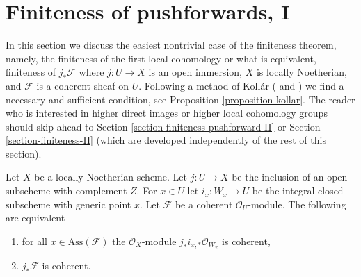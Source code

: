 \section{Finiteness of pushforwards, I}
\label{section-finiteness-pushforward}

\noindent
In this section we discuss the easiest nontrivial case of the
finiteness theorem, namely, the finiteness of the first local
cohomology or what is equivalent, finiteness of $j_*\mathcal{F}$
where $j : U \to X$ is an open immersion, $X$ is locally Noetherian, and
$\mathcal{F}$ is a coherent sheaf on $U$. Following a method of Koll\'ar
(\cite{Kollar-variants} and \cite{Kollar-local-global-hulls})
we find a necessary and sufficient condition, see
Proposition \ref{proposition-kollar}. The reader who is interested
in higher direct images or higher local cohomology groups should skip
ahead to Section \ref{section-finiteness-pushforward-II} or
Section \ref{section-finiteness-II} (which are developed
independently of the rest of this section).

\begin{lemma}
\label{lemma-check-finiteness-pushforward-on-associated-points}
Let $X$ be a locally Noetherian scheme. Let $j : U \to X$ be the inclusion
of an open subscheme with complement $Z$. For $x \in U$ let
$i_x : W_x \to U$ be the integral closed subscheme with generic point $x$.
Let $\mathcal{F}$ be a coherent $\mathcal{O}_U$-module.
The following are equivalent
\begin{enumerate}
\item for all $x \in \text{Ass}(\mathcal{F})$ the
$\mathcal{O}_X$-module $j_*i_{x, *}\mathcal{O}_{W_x}$ is coherent,
\item $j_*\mathcal{F}$ is coherent.
\end{enumerate}
\end{lemma}

